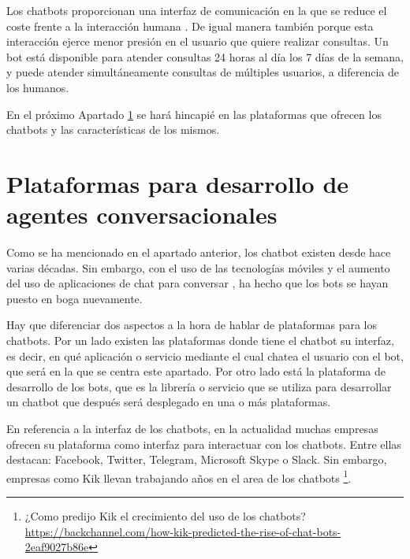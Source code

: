 Los chatbots proporcionan una interfaz de comunicación en la que se reduce el coste frente a la interacción humana \cite{Dans2016}. De igual manera también porque esta interacción ejerce menor presión en el usuario que quiere realizar consultas. Un bot está disponible para atender consultas 24 horas al día los 7 días de la semana, y puede atender simultáneamente consultas de múltiples usuarios, a diferencia de los humanos.

En el próximo Apartado \ref{sec:PlataformasChatbot} se hará hincapié en las plataformas que ofrecen los chatbots y las características de los mismos.

\section{Plataformas para desarrollo de agentes conversacionales}
\label{sec:PlataformasChatbot}

Como se ha mencionado en el apartado anterior, los chatbot existen desde hace varias décadas. Sin embargo, con el uso de las tecnologías móviles y el aumento del uso de aplicaciones de chat para conversar \cite{Montag2015}, ha hecho que los bots se hayan puesto en boga nuevamente.

Hay que diferenciar dos aspectos a la hora de hablar de plataformas para los chatbots. Por un lado existen las plataformas donde tiene el chatbot su interfaz, es decir, en qué aplicación o servicio mediante el cual chatea el usuario con el bot, que será en la que se centra este apartado. Por otro lado está la plataforma de desarrollo de los bots, que es la librería o servicio que se utiliza para desarrollar un chatbot que después será desplegado en una o más plataformas.

En referencia a la interfaz de los chatbots, en la actualidad muchas empresas ofrecen su plataforma como interfaz para interactuar con los chatbots. Entre ellas destacan: Facebook, Twitter, Telegram, Microsoft Skype o Slack. Sin embargo, empresas como Kik llevan trabajando años en el area de los chatbots \footnote{¿Como predijo Kik el crecimiento del uso de los chatbots? \url{https://backchannel.com/how-kik-predicted-the-rise-of-chat-bots-2eaf9027b86e}}.

